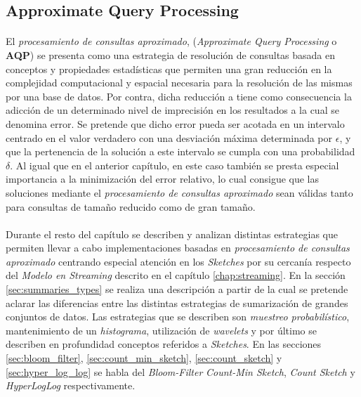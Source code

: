 \documentclass{subfiles}
\begin{document}
      \subsection{Approximate Query Processing}
      \label{sec:aproximate_query_processing}

        \paragraph{}
        El \emph{procesamiento de consultas aproximado}, (\emph{Approximate Query Processing} o \textbf{AQP}) se presenta como una estrategia de resolución de consultas basada en conceptos y propiedades estadísticas que permiten una gran reducción en la complejidad computacional y espacial necesaria para la resolución de las mismas por una base de datos. Por contra, dicha reducción a tiene como consecuencia la adicción de un determinado nivel de imprecisión en los resultados a la cual se denomina error. Se pretende que dicho error pueda ser acotada en un intervalo centrado en el valor verdadero con una desviación máxima determinada por $\epsilon$, y que la pertenencia de la solución a este intervalo se cumpla con una probabilidad $\delta$. Al igual que en el anterior capítulo, en este caso también se presta especial importancia a la minimización del error relativo, lo cual consigue que las soluciones mediante el \emph{procesamiento de consultas aproximado} sean válidas tanto para consultas de tamaño reducido como de gran tamaño.


      \paragraph{}
      Durante el resto del capítulo se describen y analizan distintas estrategias que permiten llevar a cabo implementaciones basadas en \emph{procesamiento de consultas aproximado} centrando especial atención en los \emph{Sketches} por su cercanía respecto del \emph{Modelo en Streaming} descrito en el capítulo \ref{chap:streaming}. En la sección \ref{sec:summaries_types} se realiza una descripción a partir de la cual se pretende aclarar las diferencias entre las distintas estrategias de sumarización de grandes conjuntos de datos. Las estrategias que se describen son \emph{muestreo probabilístico}, mantenimiento de un \emph{histograma}, utilización de \emph{wavelets} y por último se describen en profundidad conceptos referidos a \emph{Sketches}. En las secciones \ref{sec:bloom_filter}, \ref{sec:count_min_sketch}, \ref{sec:count_sketch} y \ref{sec:hyper_log_log} se habla del \emph{Bloom-Filter} \emph{Count-Min Sketch}, \emph{Count Sketch} y \emph{HyperLogLog} respectivamente.
\end{document}
